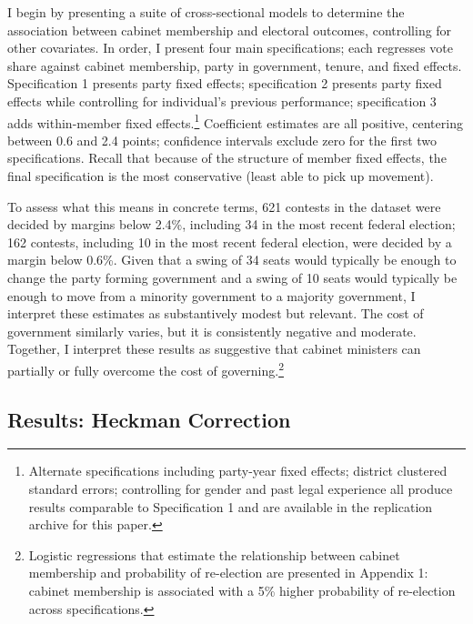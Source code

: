 \documentclass[letter,12pt]{article}
\begin{document}
I begin by presenting a suite of cross-sectional models to determine the association between cabinet membership and electoral outcomes, controlling for other covariates. In order, I present four main specifications; each regresses vote share against cabinet membership, party in government, tenure, and fixed effects. Specification 1 presents party fixed effects; specification 2 presents party fixed effects while controlling for individual's previous performance; specification 3 adds within-member fixed effects.\footnote{Alternate specifications including party-year fixed effects; district clustered standard errors; controlling for gender and past legal experience all produce results comparable to Specification 1 and are available in the replication archive for this paper.} Coefficient estimates are all positive, centering between 0.6 and 2.4 points; confidence intervals exclude zero for the first two specifications. Recall that because of the structure of member fixed effects, the final specification is the most conservative (least able to pick up movement). 

To assess what this means in concrete terms, 621 contests in the dataset were decided by margins below 2.4\%, including 34 in the most recent federal election; 162 contests, including 10 in the most recent federal election, were decided by a margin below 0.6\%. Given that a swing of 34 seats would typically be enough to change the party forming government and a swing of 10 seats would typically be enough to move from a minority government to a majority government, I interpret these estimates as substantively modest but relevant. The cost of government similarly varies, but it is consistently negative and moderate. Together, I interpret these results as suggestive that cabinet ministers can partially or fully overcome the cost of governing.\footnote{Logistic regressions that estimate the relationship between cabinet membership and probability of re-election are presented in Appendix 1: cabinet membership is associated with a 5\% higher probability of re-election across specifications.}


\pagebreak

\subsection*{Results: Heckman Correction}
\end{document}
